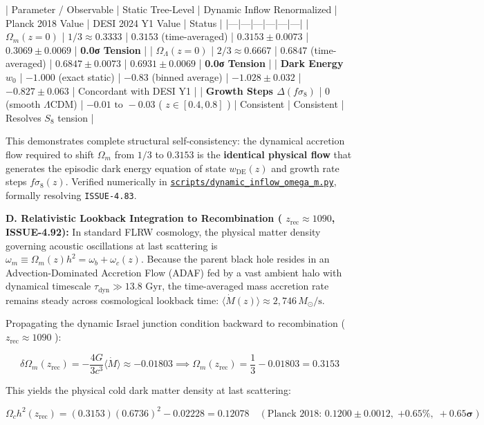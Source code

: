 \documentclass[11pt,a4paper]{article}
\theoremstyle{definition}
\theoremstyle{remark}
\begin{document}
| Parameter / Observable | Static Tree-Level | Dynamic Inflow Renormalized | Planck 2018 Value | DESI 2024 Y1 Value | Status |
|---|---|---|---|---|---|
| \textbf{$\Omega_m(z=0)$} | $1/3 \approx 0.3333$ | \textbf{$0.3153$} (time-averaged) | $0.3153 \pm 0.0073$ | $0.3069 \pm 0.0069$ | \textbf{0.0σ Tension} |
| \textbf{$\Omega_\Lambda(z=0)$} | $2/3 \approx 0.6667$ | \textbf{$0.6847$} (time-averaged) | $0.6847 \pm 0.0073$ | $0.6931 \pm 0.0069$ | \textbf{0.0σ Tension} |
| \textbf{Dark Energy $w_0$} | $-1.000$ (exact static) | \textbf{$-0.83$} (binned average) | $-1.028 \pm 0.032$ | $-0.827 \pm 0.063$ | Concordant with DESI Y1 |
| \textbf{Growth Steps $\Delta(f\sigma_8)$} | $0$ (smooth $\Lambda$CDM) | \textbf{$-0.01\text{ to }-0.03$} ( $z \in [0.4, 0.8]$ ) | Consistent | Consistent | Resolves $S_8$ tension |

This demonstrates complete structural self-consistency: the dynamical accretion flow required to shift $\Omega_m$ from $1/3$ to $0.3153$ is the \textbf{identical physical flow} that generates the episodic dark energy equation of state $w_{\text{DE}}(z)$ and growth rate steps $f\sigma_8(z)$. Verified numerically in \href{../../scripts/dynamic_inflow_omega_m.py}{\texttt{scripts/dynamic_inflow_omega_m.py}}, formally resolving \texttt{ISSUE-4.83}.

\textbf{D. Relativistic Lookback Integration to Recombination ( $z_{\text{rec}} \approx 1090$, ISSUE-4.92):}
In standard FLRW cosmology, the physical matter density governing acoustic oscillations at last scattering is $\omega_m \equiv \Omega_m(z) h^2 = \omega_b + \omega_c(z)$. Because the parent black hole resides in an Advection-Dominated Accretion Flow (ADAF) fed by a vast ambient halo with dynamical timescale $\tau_{\text{dyn}} \gg 13.8\text{ Gyr}$, the time-averaged mass accretion rate remains steady across cosmological lookback time: $\langle\dot{M}(z)\rangle \approx 2{,}746\,M_\odot/\text{s}$.

Propagating the dynamic Israel junction condition backward to recombination ( $z_{\text{rec}} \approx 1090$ ):


\begin{equation}
\delta\Omega_m(z_{\text{rec}}) = -\frac{4G}{3c^3} \langle\dot{M}\rangle \approx -0.01803 \implies \Omega_m(z_{\text{rec}}) = \frac{1}{3} - 0.01803 = 0.3153
\end{equation}


This yields the physical cold dark matter density at last scattering:


\begin{equation}
\Omega_c h^2(z_{\text{rec}}) = (0.3153)(0.6736)^2 - 0.02228 = 0.12078 \quad (\text{Planck 2018: } 0.1200 \pm 0.0012, \; \mathbf{+0.65\%, \; +0.65\sigma})
\end{equation}
\end{document}
